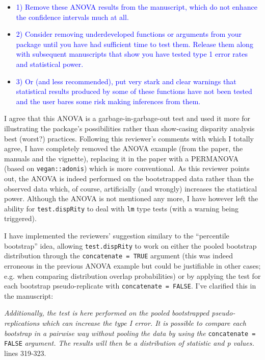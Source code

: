 \documentclass[12pt,letterpaper]{article}
\begin{document}
\begin{enumerate}
\begin{itemize}
\item \textcolor{blue}{1) Remove these ANOVA results from the manuscript, which do not enhance the confidence intervals much at all.}

\item \textcolor{blue}{2) Consider removing underdeveloped functions or arguments from your package until you have had sufficient time to test them.  Release them along with subsequent manuscripts that show you have tested type 1 error rates and statistical power.}

\item \textcolor{blue}{3) Or (and less recommended), put very stark and clear warnings that statistical results produced by some of these functions have not been tested and the user bares some risk making inferences from them.}

\end{itemize}


I agree that this ANOVA is a garbage-in-garbage-out test and used it more for illustrating the package's possibilities rather than show-casing disparity analysis best (worst?) practices.
Following this reviewer's comments with which I totally agree, I have completely removed the ANOVA example (from the paper, the manuals and the vignette), replacing it in the paper with a PERMANOVA (based on \texttt{vegan::adonis}) which is more conventional.
As this reviewer points out, the ANOVA is indeed performed on the bootstrapped data rather than the observed data which, of course, artificially (and wrongly) increases the statistical power.
Although the ANOVA is not mentioned any more, I have however left the ability for \texttt{test.dispRity} to deal with \texttt{lm} type tests (with a warning being triggered).

I have implemented the reviewers' suggestion similary to the ``percentile bootstrap'' idea, allowing \texttt{test.dispRity} to work on either the pooled bootstrap distribution through the \texttt{concatenate = TRUE} argument (this was indeed erroneous in the previous ANOVA example but could be justifiable in other cases; e.g. when comparing distribution overlap probabilities) or by applying the test for each bootstrap pseudo-replicate with \texttt{concatenate = FALSE}. I've clarified this in the manuscript:

\textit{Additionally, the test is here performed on the pooled bootstrapped pseudo-replications which can increase the type I error.
It is possible to compare each bootstrap in a pairwise way without pooling the data by using the} \texttt{concatenate = FALSE} \textit{argument.
The results will then be a distribution of statistic and p values.} lines 319-323.


\end{enumerate}
\end{document}
